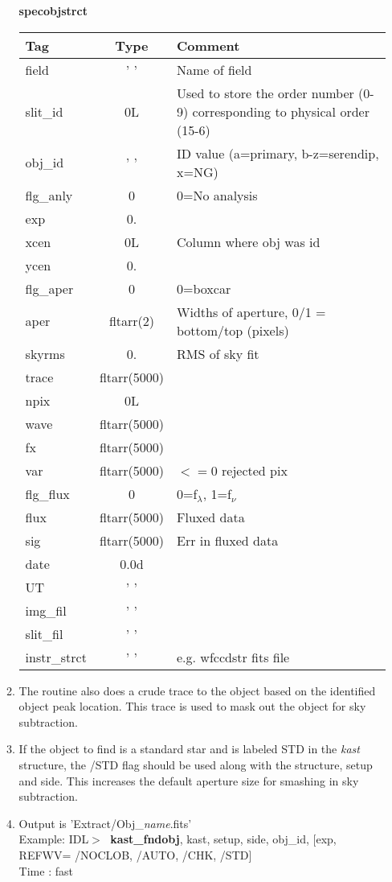 \documentclass[11pt,letterpaper,dvips]{article}
\begin{document}
\begin{enumerate}
\begin{enumerate}
\clearpage

	\begin{center}
	  {\Large {\bf specobjstrct} }
	\end{center}
	{\small
	\begin{tabular}{lcl}
	  \hline
	  Tag & Type & Comment \\
	  \hline
         field &  ' ' &  Name of field \\
         slit\_id &  0L & Used to store the order number (0-9) corresponding to
				physical order (15-6)\\  
         obj\_id &  ' ' & ID value (a=primary, b-z=serendip, x=NG) \\
         flg\_anly &  0 &  0=No analysis\\ 
         exp &  0. & \\
         xcen &  0L &  Column where obj was id\\
         ycen &  0. & \\
         flg\_aper &  0 &  0=boxcar\\
         aper &  fltarr(2) &  Widths of aperture, 0/1 = bottom/top (pixels)\\
         skyrms &  0. &  RMS of sky fit\\
         trace &  fltarr(5000) &\\
         npix &  0L & \\
         wave &  fltarr(5000) & \\
         fx &  fltarr(5000) & \\
         var &  fltarr(5000) &    $<=0$  rejected pix\\
         flg\_flux & 0 &    0=f$_\lambda$, 1=f$_\nu$\\
         flux &  fltarr(5000) &    Fluxed data\\
         sig &  fltarr(5000) &    Err in fluxed data\\
         date &  0.0d \\
         UT &  ' ' \\
         img\_fil &  ' ' \\
         slit\_fil &  ' ' \\
         instr\_strct &  ' ' & e.g. wfccdstr fits file\\
	  \hline
	\end{tabular}
	}

	\item The routine also does a crude trace to the object based on the
	identified object peak location.  This trace is used to mask out the
	object for sky subtraction.
	\item If the object to find is a standard star and is labeled STD in the 
	{\it kast} structure, the /STD flag should be used along with the 
	structure, setup and side.  This increases the default aperture size for 
	smashing in sky subtraction.
	\item Output is 'Extract/Obj\_{\it name}.fits' \\
         \quad Example: IDL$> \;$ {\bf kast\_fndobj}, kast, setup, side, obj\_id,
		[exp, REFWV= /NOCLOB, /AUTO, /CHK, /STD] \\
         \quad Time   : fast 


\end{enumerate}
\end{enumerate}
\end{document}
